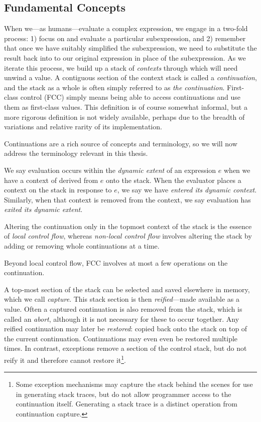 \documentclass[11pt]{article}
\begin{document}
\subsection{Fundamental Concepts}
When we---as humans---evaluate a complex expression, we engage in a two-fold process: 1) focus on and evaluate a particular subexpression, and 2) remember that once we have suitably simplified the subexpression, we need to substitute the result back into to our original expression in place of the subexpression.
As we iterate this process, we build up a stack of \emph{contexts} through which will need unwind a value.
A contiguous section of the context stack is called a \emph{continuation}, and the stack as a whole is often simply referred to as \emph{the continuation}.
First-class control (FCC) simply means being able to access continuations and use them as first-class values.
This definition is of course somewhat informal, but a more rigorous definition is not widely available, perhaps due to the breadth of variations and relative rarity of its implementation.

Continuations are a rich source of concepts and terminology, so we will now address the terminology relevant in this thesis.

We say evaluation occurs within the \emph{dynamic extent} of an expression $e$ when we have a context of derived from $e$ onto the stack.
When the evaluator places a context on the stack in response to $e$, we say we have \emph{entered its dynamic context}.
Similarly, when that context is removed from the context, we say evaluation has \emph{exited its dynamic extent}.

Altering the continuation only in the topmost context of the stack is the essence of \emph{local control flow}, whereas \emph{non-local control flow} involves altering the stack by adding or removing whole continuations at a time.

Beyond local control flow, FCC involves at most a few operations on the continuation.

A top-most section of the stack can be selected and saved elsewhere in memory, which we call \emph{capture}.
This stack section is then \emph{reified}---made available as a value.
Often a captured continuation is also removed from the stack, which is called an \emph{abort}, although it is not necessary for these to occur together.
Any reified continuation may later be \emph{restored}: copied back onto the stack on top of the current continuation.
Continuations may even even be restored multiple times.
In contrast, exceptions remove a section of the control stack, but do not reify it and therefore cannot restore it\footnote{Some exception mechanisms may capture the stack behind the scenes for use in generating stack traces, but do not allow programmer access to the continuation itself. Generating a stack trace is a distinct operation from continuation capture.}.
\end{document}

